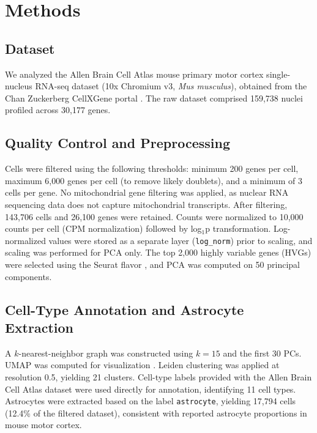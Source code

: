 \documentclass[sigconf]{acmart}
\begin{document}
\section{Methods}

\subsection{Dataset}
We analyzed the Allen Brain Cell Atlas mouse primary motor cortex single-nucleus RNA-seq dataset (10x Chromium v3, \textit{Mus musculus}), obtained from the Chan Zuckerberg CellXGene portal \cite{tasic2018shared}. The raw dataset comprised 159,738 nuclei profiled across 30,177 genes.

\subsection{Quality Control and Preprocessing}
Cells were filtered using the following thresholds: minimum 200 genes per cell, maximum 6,000 genes per cell (to remove likely doublets), and a minimum of 3 cells per gene. No mitochondrial gene filtering was applied, as nuclear RNA sequencing data does not capture mitochondrial transcripts. After filtering, 143,706 cells and 26,100 genes were retained. Counts were normalized to 10,000 counts per cell (CPM normalization) followed by log$_1$p transformation. Log-normalized values were stored as a separate layer (\texttt{log\_norm}) prior to scaling, and scaling was performed for PCA only. The top 2,000 highly variable genes (HVGs) were selected using the Seurat flavor \cite{stuart2019comprehensive}, and PCA was computed on 50 principal components.

\subsection{Cell-Type Annotation and Astrocyte Extraction}
A $k$-nearest-neighbor graph was constructed using $k = 15$ and the first 30 PCs. UMAP was computed for visualization \cite{mcinnes2018umap}. Leiden clustering \cite{traag2019louvain} was applied at resolution 0.5, yielding 21 clusters. Cell-type labels provided with the Allen Brain Cell Atlas dataset were used directly for annotation, identifying 11 cell types. Astrocytes were extracted based on the label \texttt{astrocyte}, yielding 17,794 cells (12.4\% of the filtered dataset), consistent with reported astrocyte proportions in mouse motor cortex.
\end{document}
